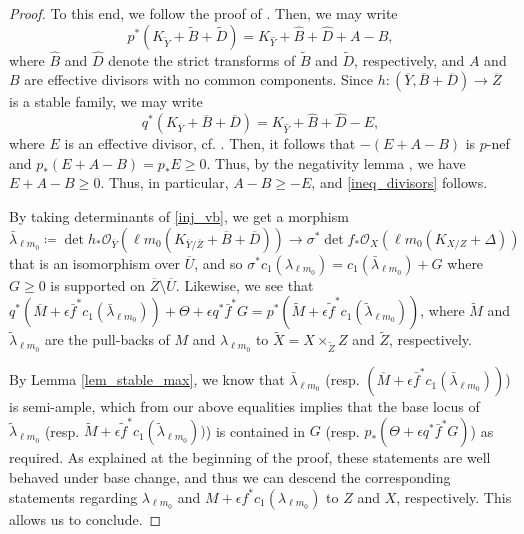 \documentclass[12pt]{amsart}
\theoremstyle{plain}
\theoremstyle{definition}
\def\scr #1.{\mathcal #1}
\def\det{\operatorname{det}}
\def\rar{\rightarrow}
\def\K#1.{K_{#1}}
\def\subs#1.{_{#1}}
\begin{document}
\begin{proof}
To this end, we follow the proof of \cite[Theorem 11.40]{Kollar21}.
Then, we may write
\[
p^*(\K \tilde Y. + \tilde B + \tilde D)= \K \hat{Y}. + \hat{B} + \hat{D} + A -B,
\]
where $\hat{B}$ and $\hat{D}$ denote the strict transforms of $\tilde B$ and $\tilde D$, respectively, 
and $A$ and $B$ are effective divisors with no common components.
Since $h \colon (\overline{Y}, \overline{B} + \overline{D}) \rar \overline{Z}$ is a stable family, we may write
\[
q^*(\K \overline{Y}. + \overline{B} + \overline{D})= \K \hat{Y}. + \hat{B} + \hat{D} -E,
\]
where $E$ is an effective divisor, cf. \cite[Proposition 2.15]{Kollar21}.
Then, it follows that $-(E+A-B)$ is $p$-nef and $p_{*}(E+A-B)=p_{*}E \geq 0$.
Thus, by the negativity lemma \cite[Lemma 3.39]{KM98}, we have $E+A-B \geq 0$.
Thus, in particular, $A-B \geq -E$, and \eqref{ineq_divisors} follows.


By taking determinants of \eqref{inj_vb}, we get a morphism
\begin{equation} \label{inj_lb}
\bar{\lambda}_{\ell m_0}\coloneqq \det h \subs *. \scr O_{\overline{Y}}.(\ell m_0(\K \overline Y /\overline Z. + \overline B  + \overline D )) 
\rar \sigma^*\det f_* \scr O_X.(\ell m_0(\K X/Z.+\Delta))
\end{equation}
that is an isomorphism over $\overline{U}$, and so
$\sigma^*c_1(\lambda_{\ell m_0}) = c_1(\bar{\lambda}_{\ell m_0})+G$
where $G \geq 0$ is supported on $\overline{Z} \setminus \overline{U}$.
Likewise, we see that 
$q^*(\overline{M}+\epsilon \bar{f}^*c_1(\bar{\lambda}_{\ell m_0}))+\Theta+\epsilon q^*\bar{f}^*G = p^*(\tilde M+\epsilon \tilde f^*c_1(\tilde{\lambda}_{\ell m_0}))$,
where $\tilde M$ and $\tilde \lambda _{\ell m_0}$ are the pull-backs of $M$ and $\lambda_{\ell m_0}$ to $\tilde X = X \times_{\tilde Z} Z$ and $\tilde Z$, respectively.

By Lemma \ref{lem_stable_max}, we know that $\bar{\lambda}_{\ell m_0}$ 
(resp. $(\overline{M}+\epsilon \bar{f}^*c_1(\bar{\lambda}_{\ell m_0}))$) is semi-ample, 
which from our above equalities implies that the base locus of $\tilde{\lambda}_{\ell m_0}$ 
(resp. $\tilde M+\epsilon \tilde f^* c_1(\tilde \lambda_{\ell m_0}))$) is contained in
$G$ (resp. $p_*(\Theta+\epsilon q^*\bar{f}^*G)$) as required.
As explained at the beginning of the proof, these statements are well behaved under base change, and thus we can descend the corresponding statements regarding
$\lambda _{\ell m_0}$ and $M + \epsilon f^* c_1(\lambda_{\ell m_0})$ to $Z$ and $X$, respectively.
This allows us to conclude.
\end{proof}
\end{document}
